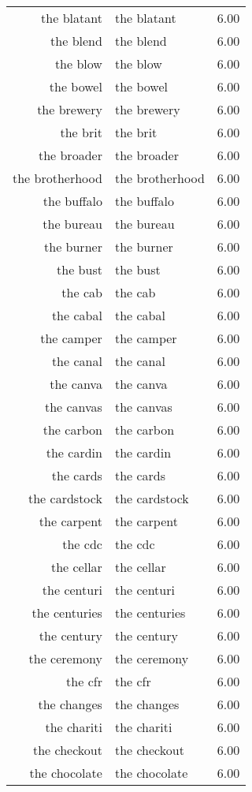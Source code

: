 \begin{table}[ht]
\begin{tabular}{rlr}
  the blatant & the blatant & 6.00 \\ 
  the blend & the blend & 6.00 \\ 
  the blow & the blow & 6.00 \\ 
  the bowel & the bowel & 6.00 \\ 
  the brewery & the brewery & 6.00 \\ 
  the brit & the brit & 6.00 \\ 
  the broader & the broader & 6.00 \\ 
  the brotherhood & the brotherhood & 6.00 \\ 
  the buffalo & the buffalo & 6.00 \\ 
  the bureau & the bureau & 6.00 \\ 
  the burner & the burner & 6.00 \\ 
  the bust & the bust & 6.00 \\ 
  the cab & the cab & 6.00 \\ 
  the cabal & the cabal & 6.00 \\ 
  the camper & the camper & 6.00 \\ 
  the canal & the canal & 6.00 \\ 
  the canva & the canva & 6.00 \\ 
  the canvas & the canvas & 6.00 \\ 
  the carbon & the carbon & 6.00 \\ 
  the cardin & the cardin & 6.00 \\ 
  the cards & the cards & 6.00 \\ 
  the cardstock & the cardstock & 6.00 \\ 
  the carpent & the carpent & 6.00 \\ 
  the cdc & the cdc & 6.00 \\ 
  the cellar & the cellar & 6.00 \\ 
  the centuri & the centuri & 6.00 \\ 
  the centuries & the centuries & 6.00 \\ 
  the century & the century & 6.00 \\ 
  the ceremony & the ceremony & 6.00 \\ 
  the cfr & the cfr & 6.00 \\ 
  the changes & the changes & 6.00 \\ 
  the chariti & the chariti & 6.00 \\ 
  the checkout & the checkout & 6.00 \\ 
  the chocolate & the chocolate & 6.00 \\ 

\end{tabular}
\end{table}
